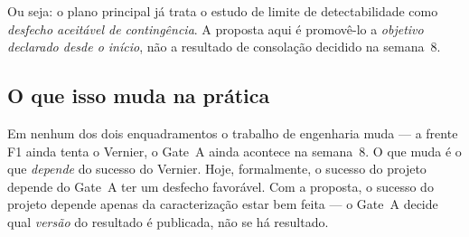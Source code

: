 \documentclass[11pt,a4paper]{article}
\begin{document}
Ou seja: o plano principal já trata o estudo de limite de detectabilidade como
\emph{desfecho aceitável de contingência}. A proposta aqui é promovê-lo a
\emph{objetivo declarado desde o início}, não a resultado de consolação decidido na
semana~8.

\subsection{O que isso muda na prática}
\label{sec:pratica}

\begin{keybox}[title={A diferença não é técnica, é de sequenciamento}]
Em nenhum dos dois enquadramentos o trabalho de engenharia muda --- a frente F1
ainda tenta o Vernier, o Gate~A ainda acontece na semana~8. O que muda é o que
\emph{depende} do sucesso do Vernier. Hoje, formalmente, o sucesso do projeto
depende do Gate~A ter um desfecho favorável. Com a proposta, o sucesso do projeto
depende apenas da caracterização estar bem feita --- o Gate~A decide qual
\emph{versão} do resultado é publicada, não se há resultado.
\end{keybox}
\end{document}
